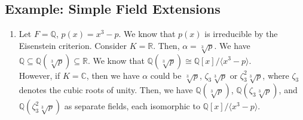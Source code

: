 \documentclass[8pt]{extarticle}
\newcommand{\Q}{\mathbb{Q}}
\newcommand{\R}{\mathbb{R}}
\newcommand{\C}{\mathbb{C}}
\begin{document}
  \subsection{Example: Simple Field Extensions}%
  \begin{enumerate}[(1)]
    \item Let $F = \Q$, $p(x) = x^3 - p$. We know that $p(x)$ is irreducible by the Eisenstein criterion. Consider $K = \R$. Then, $\alpha = \sqrt[3]{p}$. We have $\Q \subseteq \Q(\sqrt[3]{p}) \subseteq \R$. We know that $\Q(\sqrt[3]{p})\cong \Q[x]/\langle x^3-p\rangle$.\\

      However, if $K = \C$, then we have $\alpha$ could be $\sqrt[3]{p}$, $\zeta_3\sqrt[3]{p}$ or $\zeta_3^2\sqrt[3]{p}$, where $\zeta_3$ denotes the cubic roots of unity. Then, we have $\Q(\sqrt[3]{p})$, $\Q(\zeta_3\sqrt[3]{p})$, and $\Q(\zeta_3^2\sqrt[3]{p})$ as separate fields, each isomorphic to $\Q[x]/\langle x^3 - p \rangle$.
  \end{enumerate}
\end{document}
